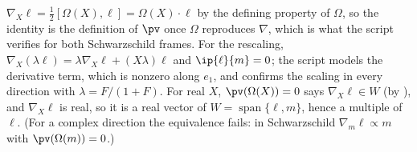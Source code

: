 $\nabla_{X}\ell = \tfrac12[\Omega(X), \ell] = \Omega(X)\cdot\ell$ by the defining property of $\Omega$, so the identity is the definition of $\pv$ once $\Omega$ reproduces $\nabla$, which is what the script verifies for both Schwarzschild frames. For the rescaling, $\nabla_{X}(\lambda\ell) = \lambda\nabla_{X}\ell + (X\lambda)\ell$ and $\ip{\ell}{m} = 0$; the script models the derivative term, which is nonzero along $e_{1}$, and confirms the scaling in every direction with $\lambda = F/(1+F)$. For real $X$, $\pv(\Omega(X)) = 0$ says $\nabla_{X}\ell \in W$ (by ), and $\nabla_{X}\ell$ is real, so it is a real vector of $W = \operatorname{span}\{\ell, m\}$, hence a multiple of $\ell$. (For a complex direction the equivalence fails: in Schwarzschild $\nabla_{m}\ell \propto m$ with $\pv(\Omega(m)) = 0$.)
